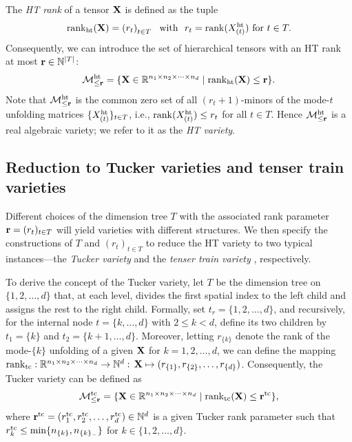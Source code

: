 The \emph{HT rank} of a tensor $\mathbf{X}$ is defined as the tuple
$$
\mathrm{rank}_{\mathrm{ht}}(\mathbf{X})=\left(r_t\right)_{t\in T}\  \text{ with }\  r_t=\operatorname{rank}(X^{\mathrm{ht}}_{(t)})\ \text{for}\ t\in T.
$$
Consequently, we can introduce the set of hierarchical tensors with an HT rank at most $\mathbf{r}\in\mathbb{N}^{|T|}$:
\begin{equation*}
    \mathcal{M}^{\mathrm{ht}}_{\le \mathbf{r}} = \{\mathbf{X}\in\mathbb{R}^{n_1\times n_2\times\cdots\times n_d} \mid \mathrm{rank}_{\mathrm{ht}}(\mathbf{X})\le\mathbf{r}\}.
\end{equation*}
Note that $\mathcal{M}^{\mathrm{ht}}_{\le \mathbf{r}}$ is the common zero set of all $(r_t+1)$-minors of the mode-$t$ unfolding matrices $\{X^{{\mathrm{ht}}}_{(t)}\}_{t\in T}$, i.e., $\operatorname{rank}(X^{\mathrm{ht}}_{(t)})\le r_t$ for all $t\in T$. Hence $\mathcal{M}^{\mathrm{ht}}_{\le \mathbf{r}}$ is a real algebraic variety; we refer to it as the \emph{HT variety}.



\subsection{Reduction to Tucker varieties and tenser train varieties}\label{app:reduction}
Different choices of the dimension tree $T$ with the associated rank parameter $\mathbf{r}=(r_t)_{t\in T}$ will yield varieties with different structures. We then specify the constructions of $T$ and $(r_t)_{t\in T}$ to reduce the HT variety to two typical instances---the \emph{Tucker variety} \cite{tucker1964extension,gao2025lowranktucker} and the \emph{tenser train variety} \cite{oseledets2011TTSVD,kutschan2018tangentTT}, respectively.



To derive the concept of the Tucker variety, let $T$ be the dimension tree on $\{1,2,\ldots,d\}$ that, at each level, divides the first spatial index to the left child and assigns the rest to the right child. Formally, set $t_{r}=\{1,2,\ldots,d\}$, and recursively, for the internal node $t=\{k,\ldots,d\}$ with $2\le k<d$, define its two children by $t_1=\{k\}$ and $t_2=\{k+1,\ldots,d\}$. Moreover, letting $r_{\{k\}}$ denote the rank of the mode-$\{k\}$ unfolding of a given $\mathbf{X}$ for $k=1,2,\ldots,d$, we can define the mapping $\operatorname{rank}_{\mathrm{tc}}:\mathbb{R}^{n_1\times n_2\times\cdots\times n_d}\to \mathbb{N}^d:\,\mathbf{X}\mapsto(r_{\{1\}},r_{\{2\}},\ldots,r_{\{d\}})$. Consequently, the Tucker variety can be defined as
\begin{equation}\label{eq:tctensor}
    \mathcal{M}^{\mathrm{tc}}_{\le \mathbf{r}} = \{\mathbf{X}\in\mathbb{R}^{n_1\times n_2\times\cdots\times n_d} \mid \mathrm{rank}_{\mathrm{tc}}(\mathbf{X})\le\mathbf{r}^{\mathrm{tc}}\},
\end{equation}
where $\mathbf{r}^{\mathrm{tc}}=(r^{\mathrm{tc}}_1,r^{\mathrm{tc}}_2,\ldots, r^{\mathrm{tc}}_d)\in\mathbb{N}^d$ is a given Tucker rank parameter such that $r^{\mathrm{tc}}_k\le\min\{n_{\{k\}},n_{\{k\}_-}\}$ for $k\in\{1,2,\ldots,d\}$.


